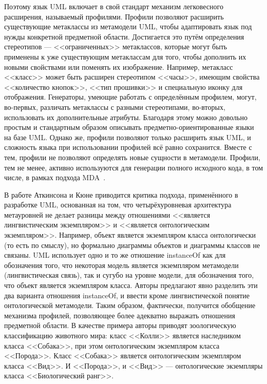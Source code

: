 Поэтому язык UML включает в свой стандарт механизм легковесного расширения, называемый 
профилями. Профили позволяют расширить существующие метаклассы из метамодели UML, 
чтобы адаптировать язык под нужды конкретной предметной области. Достигается это путём 
определения стереотипов --- <<ограниченных>> метаклассов, которые могут быть применены 
к уже существующим метаклассам для того, чтобы дополнить их новыми свойствами или 
поменять их изображение. Например, метакласс <<класс>> может быть расширен стереотипом 
<<часы>>, имеющим свойства <<количество кнопок>>, <<тип прошивки>> и специальную 
иконку для отображения. Генераторы, умеющие работать с определённым профилем, могут, 
во-первых, различать метаклассы с разными стереотипами, во-вторых, использовать их 
дополнительные атрибуты. Благодаря этому можно довольно простым и стандартным образом 
описывать предметно-ориентированные языки на базе UML. Однако же, профили позволяют 
только расширить язык UML, и сложность языка при использовании профилей всё равно 
сохранится. Вместе с тем, профили не позволяют определять новые сущности в метамодели. 
Профили, тем не менее, активно используются для генерации полного исходного кода, 
в том числе, в рамках подхода MDA~\cite{swithinbank2005patterns}.

В работе Аткинсона и Кюне \cite{atkinson2003model} приводится критика подхода, применённого в разработке UML, 
основанная на том, что четырёхуровневая архитектура метауровней не делает разницы между отношениями 
<<является лингвистическим экземпляром>> и <<является онтологическим экземпляром>>. 
Например, объект является экземпляром класса онтологически (то есть по смыслу), но 
формально диаграммы объектов и диаграммы классов не связаны. UML использует одно и 
то же отношение instanceOf как для обозначения того, что некоторая модель является 
экземпляром метамодели (лингвистическая связь), так и сугубо на уровне модели, для 
обозначения того, что объект является экземпляром класса. Авторы предлагают явно разделить 
эти два варианта отношения instanceOf, и ввести кроме лингвистической понятие онтологической 
метамодели. Таким образом, фактически, получится обобщение механизма профилей, позволяющее
более адекватно выражать отношения предметной области. В качестве примера авторы приводят 
зоологическую классификацию животного мира: класс <<Колли>> является наследником класса 
<<Собака>>, при этом онтологическим экземпляром класса <<Порода>>. Класс <<Собака>> 
является онтологическим экземпляром класса <<Вид>>. И <<Порода>>, и <<Вид>> --- онтологические 
экземпляры класса <<Биологический ранг>>.

